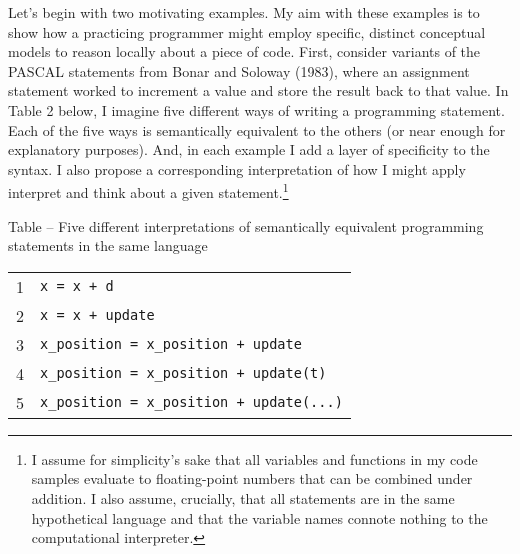 Let's begin with two motivating examples. My aim with these examples is
to show how a practicing programmer might employ specific, distinct
conceptual models to reason locally about a piece of code. First,
consider variants of the PASCAL statements from Bonar and Soloway
(1983), where an assignment statement worked to increment a value and
store the result back to that value. In Table 2 below, I imagine five
different ways of writing a programming statement. Each of the five ways
is semantically equivalent to the others (or near enough for explanatory
purposes). And, in each example I add a layer of specificity to the
syntax. I also propose a corresponding interpretation of how I might
apply interpret and think about a given statement.\footnote{I assume for
  simplicity's sake that all variables and functions in my code samples
  evaluate to floating-point numbers that can be combined under
  addition. I also assume, crucially, that all statements are in the
  same hypothetical language and that the variable names connote nothing
  to the computational interpreter.}

\protect\hypertarget{ux5fToc252445956}{}{}Table -- Five different
interpretations of semantically equivalent programming statements in the
same language

\begin{center}
  \begin{tabular}{ | l | l |}
    1 & \texttt{x\ =\ x\ +\ d} \\
    2 & \texttt{x\ =\ x\ +\ update} \\
    3 & \texttt{x\_position\ =\ x\_position\ +\ update} \\
    4 & \texttt{x\_position\ =\ x\_position\ +\ update(t)} \\
    5 & \texttt{x\_position\ =\ x\_position\ +\ update(...)} \\
  \end{tabular}
\end{center}


